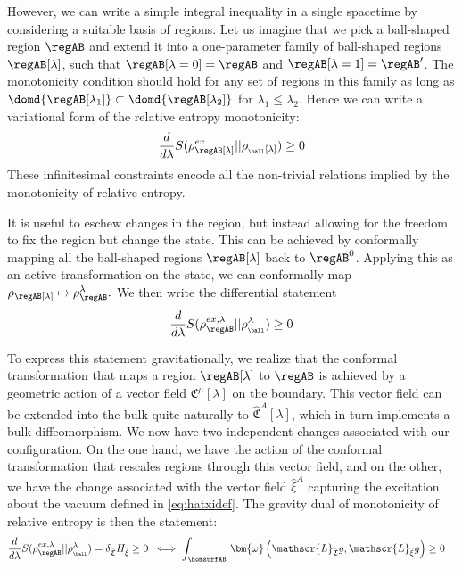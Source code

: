 \documentclass[12pt,openany]{book}
\begin{document}
\begin{itemize}
However, we can write a simple integral inequality in a single spacetime by considering a suitable basis of regions. Let us imagine that we pick a ball-shaped region $\regAB$ and extend it into a one-parameter family
of ball-shaped regions $\regAB[\lambda]$, such that $\regAB[\lambda =0]= \regAB$ and $\regAB[\lambda=1]
= \regAB'$. The monotonicity condition should hold for any set of regions in this family as long as
$\domd{\regAB[\lambda_1]} \subset \domd{\regAB[\lambda_2]} $ for  $\lambda_1 \leq \lambda_2$. Hence we can write a variational form of the relative entropy monotonicity:
%
\begin{equation}
\frac{d}{d\lambda} S(\rho^{ex}_{\regAB[\lambda]} || \rho_{_{\ball}[\lambda]}) \geq 0
\label{eq:mon1}
\end{equation}
%
These infinitesimal constraints encode all the non-trivial relations implied by the monotonicity of relative entropy.

It is useful to eschew changes in the region, but instead allowing for the freedom to fix the region but change the state. This can be achieved by conformally mapping all the ball-shaped regions $\regAB[\lambda]$ back to $\regAB^0$. Applying this as an active transformation on the state, we can conformally map
$\rho_{\regAB[\lambda]} \mapsto \rho^\lambda_{\regAB}.$ We then write the differential statement
%
\begin{equation}
\frac{d}{d\lambda} S(\rho^{ex,\lambda}_{\regAB} || \rho^\lambda_{_{\ball}}) \geq 0
\label{eq:mon2}
\end{equation}
%

To express this statement gravitationally, we realize that  the conformal transformation  that maps a region $\regAB[\lambda]$ to $\regAB$ is achieved by a geometric action of a vector field $\mathfrak{C}^\mu[\lambda]$ on the boundary. This vector field can be extended into the bulk quite naturally to $\hat{\mathfrak{C}}^A[\lambda]$, which in turn implements a bulk diffeomorphism. We now have two independent changes associated with our configuration. On the one hand,  we have the action of the conformal transformation that rescales regions through this vector field, and on the other, we have the change associated with the vector field $\hat{\xi}^A$ capturing the excitation about the vacuum defined in \eqref{eq:hatxidef}. The gravity dual of monotonicity of relative entropy is then the statement:
%
\begin{equation}
\begin{split}
& \frac{d}{d\lambda} S(\rho^{ex,\lambda}_{\regAB} || \rho^\lambda_{_{\ball}})
= \delta_{\hat{\mathfrak{C}}} H_{\hat{\xi}} \geq 0
\;\; \Longleftrightarrow \; \int_{\homsurfAB} \, \bm{\omega}\left(  \mathscr{L}_{\hat{\mathfrak{C}}} g, \mathscr{L}_{\hat{\xi}} g \right) \geq 0
 \end{split}
\label{}
\end{equation}
%
\end{itemize}

 


% 
% 


\end{document}
